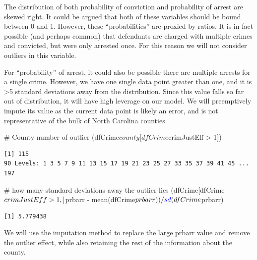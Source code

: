 \documentclass[]{article}
\newenvironment{Shaded}{}{}
\newcommand{\CommentTok}[1]{\textcolor[rgb]{0.00,0.50,0.00}{#1}}
\newcommand{\DecValTok}[1]{#1}
\newcommand{\KeywordTok}[1]{\textcolor[rgb]{0.00,0.00,1.00}{#1}}
\newcommand{\NormalTok}[1]{#1}
\newcommand{\OperatorTok}[1]{#1}
\newcommand{\StringTok}[1]{\textcolor[rgb]{0.00,0.50,0.50}{#1}}
\begin{document}
The distribution of both probability of conviction and probability of
arrest are skewed right. It could be argued that both of these variables
should be bound between 0 and 1. However, these ``probabilities'' are
proxied by ratios. It is in fact possible (and perhaps common) that
defendants are charged with multiple crimes and convicted, but were only
arrested once. For this reason we will not consider outliers in this
variable.

For ``probability'' of arrest, it could also be possible there are
multiple arrests for a single crime. However, we have one single data
point greater than one, and it is \textgreater{}5 standard deviations
away from the distribution. Since this value falls so far out of
distribution, it will have high leverage on our model. We will
preemptively impute its value as the current data point is likely an
error, and is not representative of the bulk of North Carolina counties.

\begin{Shaded}
\begin{Highlighting}[]
\CommentTok{# County number of outlier}
\NormalTok{(dfCrime}\OperatorTok{$}\NormalTok{county[dfCrime}\OperatorTok{$}\NormalTok{crimJustEff }\OperatorTok{>}\StringTok{ }\DecValTok{1}\NormalTok{]) }
\end{Highlighting}
\end{Shaded}

\begin{verbatim}
[1] 115
90 Levels: 1 3 5 7 9 11 13 15 17 19 21 23 25 27 33 35 37 39 41 45 ... 197
\end{verbatim}

\begin{Shaded}
\begin{Highlighting}[]
\CommentTok{# how many standard deviations away the outlier lies}
\NormalTok{(dfCrime[dfCrime}\OperatorTok{$}\NormalTok{crimJustEff }\OperatorTok{>}\StringTok{ }\DecValTok{1}\NormalTok{,]}\OperatorTok{$}\NormalTok{prbarr }\OperatorTok{-}\StringTok{ }\KeywordTok{mean}\NormalTok{(dfCrime}\OperatorTok{$}\NormalTok{prbarr))}\OperatorTok{/}\KeywordTok{sd}\NormalTok{(dfCrime}\OperatorTok{$}\NormalTok{prbarr)}
\end{Highlighting}
\end{Shaded}

\begin{verbatim}
[1] 5.779438
\end{verbatim}

We will use the imputation method to replace the large prbarr value and
remove the outlier effect, while also retaining the rest of the
information about the county.
\end{document}
